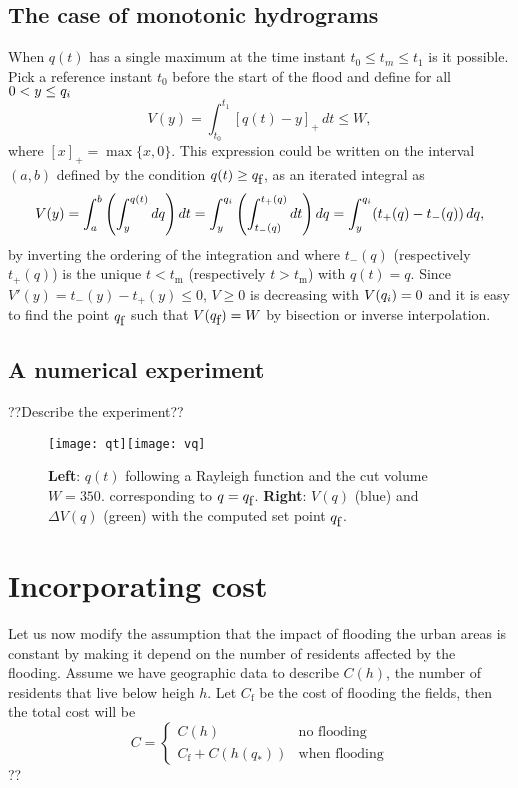 \subsection{The case of monotonic hydrograms}

When $q(t)$ has a single maximum at the time instant $t_{0}\leq t_{m}\leq t_{1}$
is it possible. Pick a reference instant $t_{0}$ before the start
of the flood and define for all $0<y\leq q_{i}$ \[
V(y)=\int_{t_{0}}^{t_{1}}\left[q(t)-y\right]_{+}\, dt\leq W,\]
where $\left[x\right]_{+}=\max\{x,0\}$. This expression could be
written on the interval $(a,b)$ defined by the condition $q(t)\geq q_{\mbox{f}}$,
as an iterated integral as\[
V(y)=\int_{a}^{b}\left(\int_{y}^{q(t)}dq\right)dt=\int_{y}^{q_{i}}\left(\int_{t_{-}(q)}^{t_{+}(q)}dt\right)dq=\int_{y}^{q_{i}}(t_{+}(q)-t_{-}(q))\, dq,\]
by inverting the ordering of the integration and where $t_{-}(q)$
(respectively $t_{+}(q)$) is the unique $t<t_{\mbox{m}}$ (respectively
$t>t_{\mbox{m}}$) with $q(t)=q$. Since $V'(y)=t_{-}(y)-t_{+}(y)\leq0$,
$V\geq0$ is decreasing with $V(q_{i})=0$ and it is easy to find the
point $q_{\mbox{f}}$ such that $V(q_{\mbox{f}})=W$ by bisection or inverse interpolation.


\subsection{A numerical experiment}

??Describe the experiment??

%
\begin{figure}


\texttt{[image: qt]}\hfill{}\texttt{[image: vq]}

\caption{\textbf{Left}: $q(t)$ following a Rayleigh function and the cut volume
$W=350.$ corresponding to $q=q_{\mbox{f}}$.\textbf{ Right}: $V(q)$ (blue)
and $\Delta V(q)$ (green) with the computed set point $q_{\mbox{f}}$. }

\end{figure}



\section{Incorporating cost}

Let us now modify the assumption that the impact of flooding the urban
areas is constant by making it depend on the number of residents affected
by the flooding. Assume we have geographic data to describe $C(h)$,
the number of residents that live below heigh $h$. Let $C_{\mbox{f}}$
be the cost of flooding the fields, then the total cost will be \[
C=\left\{ \begin{array}{cc}
C(h) & \mbox{no flooding}\\
C_{\mbox{f}}+C(h(q_{*})) & \mbox{when flooding}\end{array}\right.\]
?? 